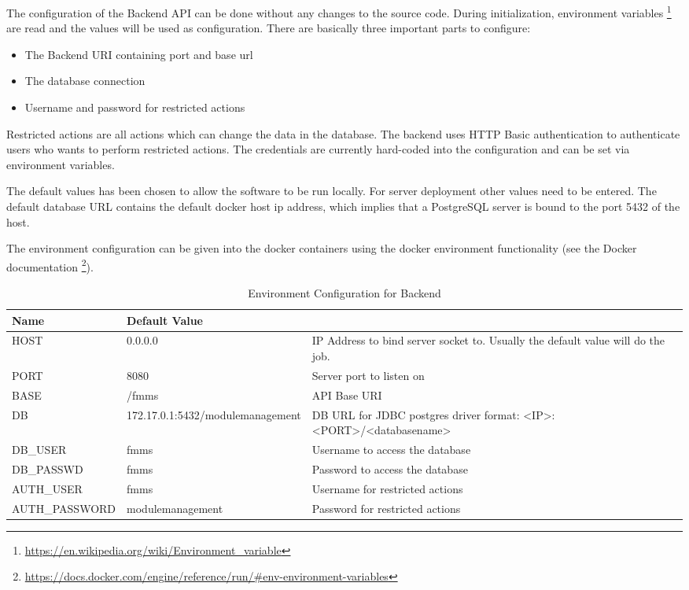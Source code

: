 The configuration of the Backend API can be done without any changes to the source code.
During initialization, environment variables \footnote{\url{https://en.wikipedia.org/wiki/Environment_variable}} are read and the values will be used as configuration.
There are basically three important parts to configure:
\begin{itemize}
	\item The Backend URI containing port and base url
	\item The database connection
	\item Username and password for restricted actions
\end{itemize}

Restricted actions are all actions which can change the data in the database. The backend uses HTTP Basic authentication to authenticate users who wants to perform restricted actions. The credentials are currently hard-coded into the configuration and can be set via environment variables.

The default values has been chosen to allow the software to be run locally. For server deployment other values need to be entered.
The default database URL contains the default docker host ip address, which implies that a PostgreSQL server is bound to the port 5432 of the host.

The environment configuration can be given into the docker containers using the docker environment functionality (see the Docker documentation \footnote{\url{https://docs.docker.com/engine/reference/run/\#env-environment-variables}}). 

\begin{minipage}{\textwidth}
\begin{table}[H]
	\renewcommand{\arraystretch}{1.2}
	\centering
	\begin{tabularx}{\textwidth}{|l|l|X|}
		\hline
		\textbf{Name} & \textbf{Default Value} &  \\ \hline
		HOST & 0.0.0.0 & IP Address to bind server socket to. Usually the default value will do the job. \\ \hline
		PORT & 8080 & Server port to listen on \\ \hline
		BASE & /fmms & API Base URI \\ \hline
		DB & 172.17.0.1:5432/modulemanagement & DB URL for JDBC postgres driver format: <IP>:<PORT>/<databasename> \\ \hline
		DB\_USER & fmms & Username to access the database \\ \hline
		DB\_PASSWD & fmms & Password to access the database \\ \hline
		AUTH\_USER & fmms & Username for restricted actions \\ \hline
		AUTH\_PASSWORD & modulemanagement & Password for restricted actions \\ \hline
	\end{tabularx}
	\caption{Environment Configuration for Backend}
	\label{backend-env}
\end{table}
\end{minipage}

